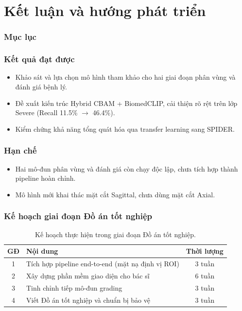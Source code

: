 \documentclass{beamer}
\numberwithin{figure}{section}
\numberwithin{table}{section}
\begin{document}
\section{Kết luận và hướng phát triển}
{
    \begin{frame}
        \frametitle{Mục lục}
    \end{frame}
}

\begin{frame}
\frametitle{Kết quả đạt được}
\begin{itemize}
    \item[--] Khảo sát và lựa chọn mô hình tham khảo cho hai giai đoạn phân vùng và đánh giá bệnh lý.
    \item[--] Đề xuất kiến trúc Hybrid CBAM + BiomedCLIP, cải thiện rõ rệt trên lớp Severe (Recall 11.5\% $\rightarrow$ 46.4\%).
    \item[--] Kiểm chứng khả năng tổng quát hóa qua transfer learning sang SPIDER.
\end{itemize}
\end{frame}

\begin{frame}
\frametitle{Hạn chế}
\begin{itemize}
    \item[--] Hai mô-đun phân vùng và đánh giá còn chạy độc lập, chưa tích hợp thành pipeline hoàn chỉnh.
    \item[--] Mô hình mới khai thác mặt cắt Sagittal, chưa dùng mặt cắt Axial.
\end{itemize}
\end{frame}

\begin{frame}
\frametitle{Kế hoạch giai đoạn Đồ án tốt nghiệp}
\begin{table}
\centering
\begin{tabular}{clc}
\toprule
\textbf{GĐ} & \textbf{Nội dung} & \textbf{Thời lượng} \\
\midrule
1 & Tích hợp pipeline end-to-end (mặt nạ định vị ROI) & 3 tuần \\
2 & Xây dựng phần mềm giao diện cho bác sĩ & 6 tuần \\
3 & Tinh chỉnh tiếp mô-đun grading & 3 tuần \\
4 & Viết Đồ án tốt nghiệp và chuẩn bị bảo vệ & 3 tuần \\
\bottomrule
\end{tabular}
\caption{Kế hoạch thực hiện trong giai đoạn Đồ án tốt nghiệp.}
\end{table}
\end{frame}
\end{document}
